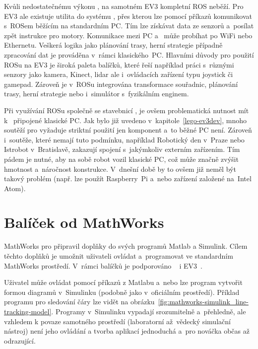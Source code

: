 Kvůli nedostatečnému výkonu , na samotném EV3 kompletní ROS neběží.
Pro EV3 ale existuje utilita do systému \evThreeDev{}, přes kterou lze pomocí příkazů komunikovat s~ROSem běžícím na standardním PC. 
Tím lze získávat data ze senzorů a~posílat zpět instrukce pro motory. 
Komunikace mezi PC a~ může probíhat po WiFi nebo Ethernetu.
Veškerá logika jako plánování trasy, herní strategie případně zpracování dat je prováděna v~rámci klasického~PC.
Hlavními důvody pro použití ROSu na EV3 je široká paleta balíčků, které řeší například práci s~různými senzory jako kamera, Kinect, lidar ale i~ovládacích zařízení typu joystick či gamepad. 
Zároveň je v~ROSu integrována transformace souřadnic, plánování trasy, herní strategie nebo i~simulátor s~fyzikálním enginem.


Při využívání ROSu společně se stavebnicí \lego{}, je ovšem problematická nutnost mít k~ připojené klasické PC. 
Jak bylo již uvedeno v~kapitole~\ref{lego-ev3dev}, mnoho soutěží pro \legoM{} vyžaduje striktní použití jen \lego{} komponent a~to běžné PC není. 
Zároveň i~soutěže, které nemají tuto podmínku, například Robotický den v~Praze nebo Istrobot v~Bratislavě, zakazují spojení s~jakýmkoliv externím zařízením.
Tím pádem je nutné, aby na sobě \lego{} robot vozil klasické PC, což může značně zvýšit hmotnost a~náročnost konstrukce. 
V~dnešní době by to ovšem již neměl být takový problém (např. lze použít Raspberry~Pi a~nebo zařízení založené na~Intel Atom).


\section{Balíček od MathWorks}
\label{lego-alternative-soft_mathworks}

MathWorks pro \legoM{} připravil doplňky do svých programů Matlab a Simulink. 
Cílem těchto doplňků je umožnit uživateli ovládat a~programovat \legoM{} ve standardním MathWorks prostředí. 
V~rámci balíčků je podporováno \legoNXT~\cite{legoProgramingPlatform_MathWork-NXT} i EV3~\cite{legoProgramingPlatform_MathWork-EV3}.

Uživatel může ovládat \brick{} pomocí příkazů z Matlabu a~nebo lze program vytvořit formou diagramů v~Simulinku (podobně jako v~oficiálním \lego{} prostředí). 
Příklad programu pro sledování čáry lze vidět na obrázku~\ref{fig:mathworks-simulink_line-tracking-model}.
Programy v~Simulinku vypadají srozumitelně a~přehledně, ale vzhledem k povaze samotného prostředí (laboratorní až~vědecký simulační nástroj) není jeho ovládání a tvorba aplikací jednoduchá a~pro nováčka občas až odrazující. 

